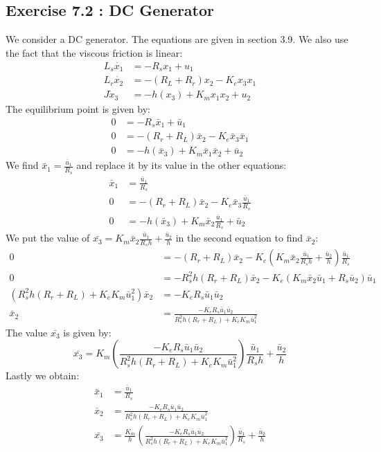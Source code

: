 \subsection*{Exercise 7.2 : DC Generator}
We consider a DC generator. The equations are given in section 3.9. We also use the fact that the viscous friction is linear: 
\begin{align*}
L_s \dot{x_1} &= -R_s x_1 + u_1 \\
L_r \dot{x_2} &= -\left( R_L + R_r \right) x_2 - K_e x_3x_1 \\
J \dot{x}_3 &= -h(x_3) + K_m x_1 x_2 + u_2   
\end{align*}
The equilibrium point is given by:
\begin{align*}
0 &= -R_s \bar{x}_1 + \bar{u}_1 \\
0 &= -\left( R_r + R_L \right) \bar{x}_2 - K_e \bar{x}_3 \bar{x}_1 \\
0 &= -h(\bar{x}_3) + K_m \bar{x}_1 \bar{x}_2 + \bar{u}_2   
\end{align*}
We find $ \bar{x}_1 = \frac{\bar{u}_1}{R_s}$ and replace it by its value in the other equations: 
\begin{align*}
\bar{x}_1 &= \frac{\bar{u}_1}{R_s} \\
0 &= -\left( R_r + R_L \right) \bar{x}_2 - K_e \bar{x}_3 \frac{\bar{u}_1}{R_s}  \\
0 &= -h(\bar{x}_3) + K_m  \bar{x}_2 \frac{\bar{u}_1}{R_s}  + \bar{u}_2   
\end{align*}
We put the value of $\bar{x_3} = K_m  \bar{x}_2 \frac{\bar{u}_1}{R_s h}  + \frac{\bar{u}_2}{h}  $ in the second equation to find $\bar{x}_2$:
\begin{align*}
0 &= -\left( R_r + R_L \right) \bar{x}_2 - K_e \left( K_m  \bar{x}_2 \frac{\bar{u}_1}{R_s h}  + \frac{\bar{u}_2}{h}  \right)  \frac{\bar{u}_1}{R_s}  \\
0 &= - R_s^2 h\left( R_r + R_L \right) \bar{x}_2 - K_e \left( K_m  \bar{x}_2 \bar{u}_1  + R_s \bar{u}_2  \right)  \bar{u}_1  \\
\left( R_s^2 h\left( R_r + R_L \right) + K_e  K_m \bar{u}_1^2  \right) \bar{x}_2 &= - K_e R_s \bar{u}_1 \bar{u}_2 \\
\bar{x}_2 &= \frac{- K_e R_s \bar{u}_1 \bar{u}_2}{R_s^2 h\left( R_r + R_L \right) + K_e  K_m \bar{u}_1^2}
\end{align*}
The value $\bar{x_3}$ is given by: \\
$$\bar{x_3} = K_m  \left(  \frac{- K_e R_s \bar{u}_1 \bar{u}_2}{R_s^2 h\left( R_r + R_L \right) + K_e  K_m \bar{u}_1^2} \right) \frac{\bar{u}_1}{R_s h}  + \frac{\bar{u}_2}{h}  $$
Lastly we obtain: 
\begin{align*}
\bar{x}_1 &= \frac{\bar{u}_1}{R_s} \\
\bar{x}_2 &= \frac{- K_e R_s \bar{u}_1 \bar{u}_2}{R_s^2 h\left( R_r + R_L \right) + K_e  K_m \bar{u}_1^2} \\
\bar{x_3} &= \frac{K_m}{h}  \left(  \frac{- K_e R_s \bar{u}_1 \bar{u}_2}{R_s^2 h\left( R_r + R_L \right) + K_e  K_m \bar{u}_1^2} \right) \frac{\bar{u}_1}{R_s}  + \frac{\bar{u}_2}{h}
\end{align*}

